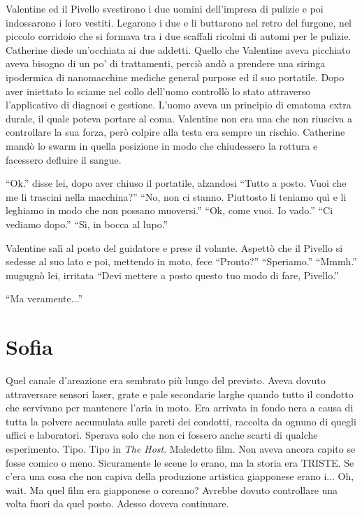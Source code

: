     Valentine ed il Pivello svestirono i due uomini dell'impresa di pulizie e poi indossarono i loro vestiti. Legarono i
    due e li buttarono nel retro del furgone, nel piccolo corridoio che si formava tra i due scaffali ricolmi di automi
    per le pulizie. Catherine diede un'occhiata ai due addetti. Quello che Valentine aveva picchiato aveva bisogno di un
    po' di trattamenti, perciò andò a prendere una siringa ipodermica di nanomacchine mediche general purpose ed il suo
    portatile. Dopo aver iniettato lo sciame nel collo dell'uomo controllò lo stato attraverso l'applicativo di diagnosi
    e gestione. L'uomo aveva un principio di ematoma extra durale, il quale poteva portare al coma. Valentine non era
    una che non riusciva a controllare la sua forza, però colpire alla testa era sempre un rischio. Catherine mandò lo
    swarm in quella posizione in modo che chiudessero la rottura e facessero defluire il sangue.

    ``Ok.'' disse lei, dopo aver chiuso il portatile, alzandosi ``Tutto a posto. Vuoi che me li trascini nella
    macchina?'' ``No, non ci stanno. Piuttosto li teniamo quì e li leghiamo in modo che non possano muoversi.'' ``Ok,
    come vuoi. Io vado.'' ``Ci vediamo dopo.'' ``Sì, in bocca al lupo.'' 

    Valentine salì al posto del guidatore e prese il volante. Aspettò che il Pivello si sedesse al suo lato e poi,
    mettendo in moto, fece ``Pronto?'' ``Speriamo.'' ``Mmmh.'' mugugnò lei, irritata ``Devi mettere a posto questo tuo
    modo di fare, Pivello.''

    ``Ma veramente...''

  \section*{Sofia}
    
    Quel canale d'areazione era sembrato più lungo del previsto. Aveva dovuto attraversare sensori laser, grate e pale
    secondarie larghe quando tutto il condotto che servivano per mantenere l'aria in moto. Era arrivata in fondo nera
    a causa di tutta la polvere accumulata sulle pareti dei condotti, raccolta da ognuno di quegli uffici e laboratori.
    Sperava solo che non ci fossero anche scarti di qualche esperimento. Tipo. Tipo in \emph{The Host}. Maledetto film.
    Non aveva ancora capito se fosse comico o meno. Sicuramente le scene lo erano, ma la storia era TRISTE. Se c'era una
    cosa che non capiva della produzione artistica giapponese erano i... Oh, wait. Ma quel film era giapponese o
    coreano? Avrebbe dovuto controllare una volta fuori da quel posto. Adesso doveva continuare.

